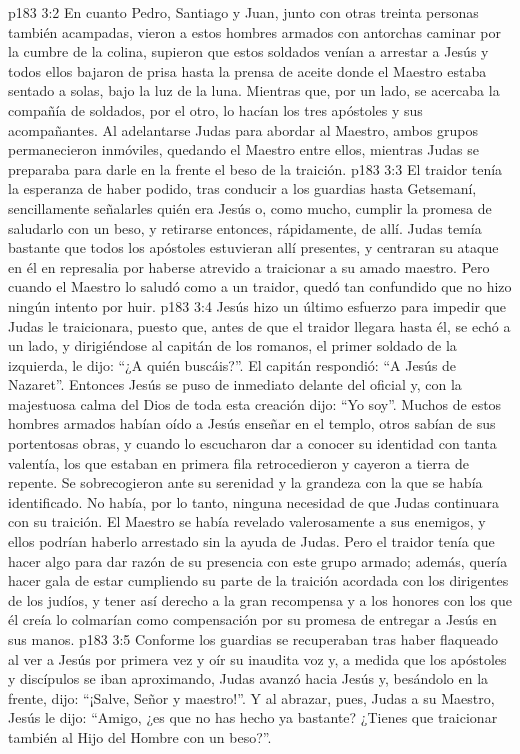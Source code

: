 \vs p183 3:2 En cuanto Pedro, Santiago y Juan, junto con otras treinta personas también acampadas, vieron a estos hombres armados con antorchas caminar por la cumbre de la colina, supieron que estos soldados venían a arrestar a Jesús y todos ellos bajaron de prisa hasta la prensa de aceite donde el Maestro estaba sentado a solas, bajo la luz de la luna. Mientras que, por un lado, se acercaba la compañía de soldados, por el otro, lo hacían los tres apóstoles y sus acompañantes. Al adelantarse Judas para abordar al Maestro, ambos grupos permanecieron inmóviles, quedando el Maestro entre ellos, mientras Judas se preparaba para darle en la frente el beso de la traición.
\vs p183 3:3 El traidor tenía la esperanza de haber podido, tras conducir a los guardias hasta Getsemaní, sencillamente señalarles quién era Jesús o, como mucho, cumplir la promesa de saludarlo con un beso, y retirarse entonces, rápidamente, de allí. Judas temía bastante que todos los apóstoles estuvieran allí presentes, y centraran su ataque en él en represalia por haberse atrevido a traicionar a su amado maestro. Pero cuando el Maestro lo saludó como a un traidor, quedó tan confundido que no hizo ningún intento por huir.
\vs p183 3:4 Jesús hizo un último esfuerzo para impedir que Judas le traicionara, puesto que, antes de que el traidor llegara hasta él, se echó a un lado, y dirigiéndose al capitán de los romanos, el primer soldado de la izquierda, le dijo: “¿A quién buscáis?”. El capitán respondió: “A Jesús de Nazaret”. Entonces Jesús se puso de inmediato delante del oficial y, con la majestuosa calma del Dios de toda esta creación dijo: “Yo soy”. Muchos de estos hombres armados habían oído a Jesús enseñar en el templo, otros sabían de sus portentosas obras, y cuando lo escucharon dar a conocer su identidad con tanta valentía, los que estaban en primera fila retrocedieron y cayeron a tierra de repente. Se sobrecogieron ante su serenidad y la grandeza con la que se había identificado. No había, por lo tanto, ninguna necesidad de que Judas continuara con su traición. El Maestro se había revelado valerosamente a sus enemigos, y ellos podrían haberlo arrestado sin la ayuda de Judas. Pero el traidor tenía que hacer algo para dar razón de su presencia con este grupo armado; además, quería hacer gala de estar cumpliendo su parte de la traición acordada con los dirigentes de los judíos, y tener así derecho a la gran recompensa y a los honores con los que él creía lo colmarían como compensación por su promesa de entregar a Jesús en sus manos.
\vs p183 3:5 Conforme los guardias se recuperaban tras haber flaqueado al ver a Jesús por primera vez y oír su inaudita voz y, a medida que los apóstoles y discípulos se iban aproximando, Judas avanzó hacia Jesús y, besándolo en la frente, dijo: “¡Salve, Señor y maestro!”. Y al abrazar, pues, Judas a su Maestro, Jesús le dijo: “Amigo, ¿es que no has hecho ya bastante? ¿Tienes que traicionar también al Hijo del Hombre con un beso?”.
